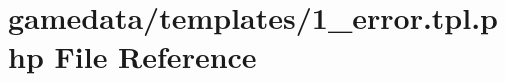 \hypertarget{1__error_8tpl_8php}{\section{gamedata/templates/1\+\_\+error.tpl.\+php File Reference}
\label{1__error_8tpl_8php}
}
